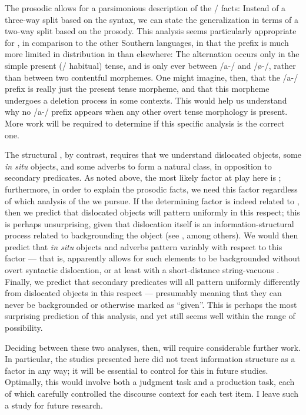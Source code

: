 \documentclass[output=paper 
,modfonts
,nonflat]{langsci/langscibook}
\begin{document}
The prosodic  allows for a parsimonious description of the
 \slash {} facts: Instead of a three-way split based on the
syntax, we can state the generalization in terms of a two-way split based on
the prosody. This analysis seems particularly appropriate for , in
comparison to the other Southern  languages, in that the  prefix
is much more limited in distribution in  than elsewhere: The
alternation occurs only in the simple present (/ habitual) tense, and is only
ever between /a-/ and /\o-/, rather than between two contentful morphemes. One
might imagine, then, that the  /a-/ prefix is really just the present
tense morpheme, and that this morpheme undergoes a deletion process in some
contexts. This would help us understand why no /a-/ prefix appears when any
other overt tense morphology is present. More work will be required to
determine if this specific analysis is the correct one.

The structural , by contrast, requires that we understand
dislocated objects, some \textit{in situ} objects, and some adverbs to form a
natural class, in opposition to secondary predicates. As noted above, the most
likely factor at play here is ; furthermore, in order to
explain the prosodic facts, we need this factor regardless of which analysis of
the  we pursue. If the determining factor is indeed related to
, then we predict that dislocated objects will pattern
uniformly in this respect; this is perhaps unsurprising, given that dislocation
itself is an information-structural process related to backgrounding the object
(see \citealt{Buell2005}, among others). We would then predict that \textit{in
situ} objects and adverbs pattern variably with respect to this factor --- that
is,  apparently allows for such elements to be backgrounded without
overt syntactic dislocation, or at least with a short-distance string-vacuous
. Finally, we predict that secondary predicates will all pattern
uniformly differently from dislocated objects in this respect --- presumably
meaning that they can never be backgrounded or otherwise marked as ``given''.
This is perhaps the most surprising prediction of this analysis, and yet still
seems well within the range of possibility.

Deciding between these two analyses, then, will require considerable further
work. In particular, the studies presented here did not treat information
structure as a factor in any way; it will be essential to control for
this in future studies. Optimally, this would involve both a judgment task and
a production task, each of which carefully controlled the discourse context for
each test item. I leave such a study for future research.
\end{document}
